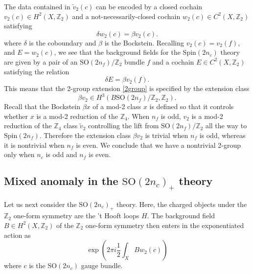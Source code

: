 \documentclass[12pt]{article}
\numberwithin{equation}{section}
\newcommand*{\bZ}{\mathbb{Z}}
\def\SO{\mathrm{SO}}
\def\Spin{\mathrm{Spin}}
\begin{document}
The data contained in $\tilde v_2(c)$ can be encoded by a closed cochain $v_2(c)\in H^2(X,\bZ_2)$
and  a not-necessarily-closed cochain $w_2(c)\in C^2(X,\bZ_2)$ satisfying \begin{equation}
\delta w_2(c) = \beta v_2(c).\label{asin}
\end{equation} where $\delta$ is the coboundary and $\beta$ is the Bockstein.
Recalling $v_2(c)=v_2(f)$, and $E=w_2(c)$, we see that the background fields for the $\Spin(2n_c)$ theory are given by a pair of an $\SO(2n_f)/\bZ_2$ bundle $f$
and a cochain $E\in C^2(X,\bZ_2)$ satisfying the relation \begin{equation}
\delta E= \beta v_2(f).
\label{ext}
\end{equation}
This means that the 2-group extension \eqref{2group} is specified by the extension class \begin{equation}
\beta v_2 \in H^3(B\SO(2n_f)/\bZ_2, \bZ_2).
\end{equation}
Recall that  the Bockstein $\beta x$ of a mod-2 class $x$ is defined so that it controls whether $x$ is a mod-2 reduction of the $\bZ_4$.
When $n_f$ is odd, $v_2$ is a mod-2 reduction of the $\bZ_4$ class $\tilde v_2$ controlling the lift from $\SO(2n_f)/\bZ_2$  all the way to $\Spin(2n_f)$.
Therefore the extension class $\beta v_2$ is trivial when $n_f$ is odd,
whereas it  is nontrivial when $n_f$ is even.
We conclude that we have a nontrivial 2-group only when $n_c$ is odd and $n_f$ is even.

\subsection{Mixed anomaly in the $\SO(2n_c)_+$ theory}
Let us next consider the $\SO(2n_c)_+$ theory.
Here, the charged objects under the $\bZ_2$ one-form symmetry are the 't Hooft loops $H$.
The background field $B\in H^2(X,\bZ_2)$ of the $\bZ_2$ one-form symmetry then enters in the exponentiated action as \begin{equation}
\exp\left( 2\pi i \frac12 \int_X B w_2(c) \right)\label{magnetic}
\end{equation} where $c$ is the $\SO(2n_c)$ gauge bundle. 
\end{document}
